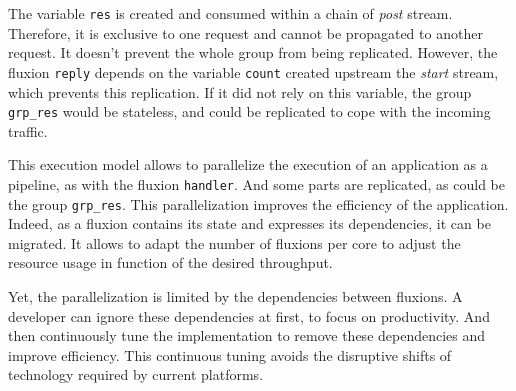 The variable \texttt{res} is created and consumed within a chain of \textit{post} stream.
Therefore, it is exclusive to one request and cannot be propagated to another request.
It doesn't prevent the whole group from being replicated.
However, the fluxion \texttt{reply} depends on the variable \texttt{count} created upstream the \textit{start} stream, which prevents this replication.
If it did not rely on this variable, the group \texttt{grp\_res} would be stateless, and could be replicated to cope with the incoming traffic.

\separator

This execution model allows to parallelize the execution of an application as a pipeline, as with the fluxion \texttt{handler}.
And some parts are replicated, as could be the group \texttt{grp\_res}.
This parallelization improves the efficiency of the application.
Indeed, as a fluxion contains its state and expresses its dependencies, it can be migrated.
It allows to adapt the number of fluxions per core to adjust the resource usage in function of the desired throughput.

Yet, the parallelization is limited by the dependencies between fluxions.
A developer can ignore these dependencies at first, to focus on productivity.
And then continuously tune the implementation to remove these dependencies and improve efficiency.
This continuous tuning avoids the disruptive shifts of technology required by current platforms.
